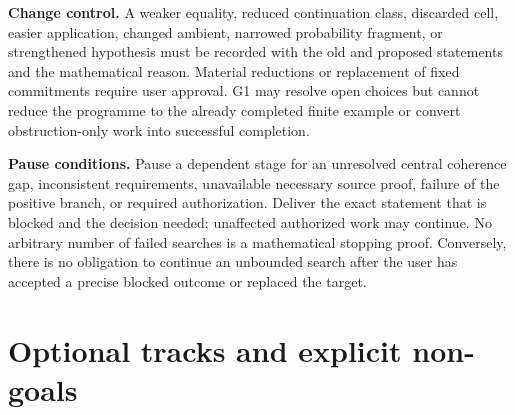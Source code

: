\documentclass[11pt,a4paper]{article}
\begin{document}
\textbf{Change control.} A weaker equality, reduced continuation class,
discarded cell, easier application, changed ambient, narrowed probability
fragment, or strengthened hypothesis must be recorded with the old and
proposed statements and the mathematical reason. Material reductions or
replacement of fixed commitments require user approval. G1 may resolve open
choices but cannot reduce the programme to the already completed finite
example or convert obstruction-only work into successful completion.

\textbf{Pause conditions.} Pause a dependent stage for an unresolved central
coherence gap, inconsistent requirements, unavailable necessary source
proof, failure of the positive branch, or required authorization. Deliver
the exact statement that is blocked and the decision needed; unaffected
authorized work may continue. No arbitrary number of failed searches is a
mathematical stopping proof. Conversely, there is no obligation to continue
an unbounded search after the user has accepted a precise blocked outcome
or replaced the target.

\section{Optional tracks and explicit non-goals}\label{sec:optional}
\end{document}
